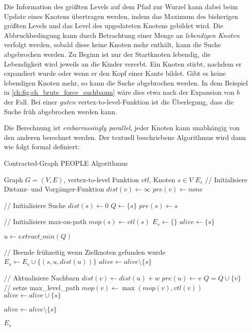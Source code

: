 Die Information des größten Levels auf dem Pfad zur Wurzel kann dabei beim Update eines Knotens übertragen werden, indem das Maximum des bisherigen größten Levels und das Level des upgedateten Knotens gebildet wird.
Die Abbruchbedingung kann durch Betrachtung einer Menge an \emph{lebendigen Knoten} verfolgt werden, sobald diese keine Knoten mehr enthält, kann die Suche abgebrochen werden.
Zu Beginn ist nur der Startknoten lebendig, die Lebendigkeit wird jeweils an die Kinder vererbt.
Ein Knoten stirbt, nachdem er expandiert wurde oder wenn er den Kopf einer Kante bildet.
Gibt es keine lebendigen Knoten mehr, so kann die Suche abgebrochen werden.
In dem Beispiel in \autoref{ch:fig:ch_brute_force_suchbaum} wäre dies etwa nach der Expansion von $b$ der Fall.
Bei einer \emph{guten} vertex-to-level-Funktion ist die Überlegung, dass die Suche früh abgebrochen werden kann.

Die Berechnung ist \emph{embarrassingly parallel}, jeder Knoten kann unabhängig von den anderen berechnet werden.
Der textuell beschriebene Algorithmus wird dann wie folgt formal definiert:

\begin{algorithm}[p]
  \caption{Contracted-Graph PEOPLE Algorithmus}
  \begin{algorithmic}[1]
    \Require Graph $G = (V, E)$, vertex-to-level Funktion ${vtl}$, Knoten $s \in V$
    \Ensure $E_s$
    \State // Initialisiere Distanz- und Vorgänger-Funktion
    \State ${dist}(v) \leftarrow \infty$
    \State ${pre}(v) \leftarrow {none}$
    \EndFor

    \State
    \State // Initialisiere Suche
    \State ${dist}(s) \leftarrow 0$
    \State $Q\leftarrow \{ s \}$
    \State ${pre}(s) \leftarrow s$

    \State
    \State // Initialisiere max-on-path
    \State ${mop}(s) \leftarrow {vtl}(s)$
    \State $E_s \leftarrow \{ \}$
    \State ${alive} \leftarrow \{ s \}$

    \State
    \State $u \leftarrow{extract\_min}(Q)$\label{graphs:dijkstra:pop}

    \State
    \State // Beende frühzeitig wenn Zielknoten gefunden wurde
    \State $E_s \leftarrow E_s \cup \{ (s, u, {dist}(u)) \}$
    \State ${alive} \leftarrow {alive} \setminus \{ s \}$
    \EndIf

    \State
    \State // Aktualisiere Nachbarn
    \State ${dist}(v) \leftarrow {dist}(u) + w$
    \State ${pre}(u) \leftarrow v$
    \State $Q = Q \cup \{ v \}$
    \State
    \State // setze max\_level\_path
    \State ${mop}(v) \leftarrow \max({mop}(v), {vtl}(v))$
    \State ${alive} \leftarrow {alive} \cup \{ s \}$
    \EndIf
    \EndIf
    \EndFor

    \State ${alive} \leftarrow {alive} \setminus \{ s \}$

    \EndWhile

    \State
    \State \Return $E_s$
  \end{algorithmic}
\end{algorithm}

